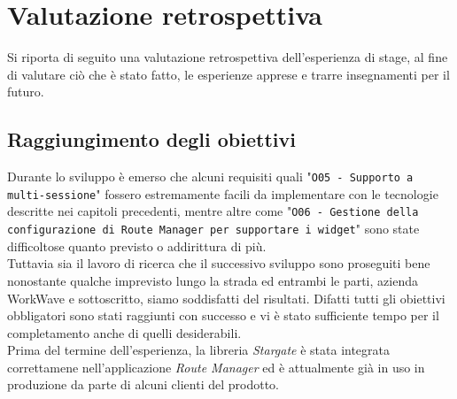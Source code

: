 
\chapter{Valutazione retrospettiva}
\label{cap:valutazione}

Si riporta di seguito una valutazione retrospettiva dell'esperienza di stage, al fine di valutare ciò che è stato fatto, le esperienze apprese e trarre insegnamenti per il futuro.

\section{Raggiungimento degli obiettivi}

Durante lo sviluppo è emerso che alcuni requisiti quali "\texttt{O05 - Supporto a multi-sessione}" fossero estremamente facili da implementare con le tecnologie descritte nei capitoli precedenti, mentre altre come "\texttt{O06 - Gestione della configurazione di Route Manager per supportare i widget}" sono state difficoltose quanto previsto o addirittura di più. \\

Tuttavia sia il lavoro di ricerca che il successivo sviluppo sono proseguiti bene nonostante qualche imprevisto lungo la strada ed entrambi le parti, azienda WorkWave e sottoscritto, siamo soddisfatti del risultati. Difatti tutti gli obiettivi obbligatori sono stati raggiunti con successo e vi è stato sufficiente tempo per il completamento anche di quelli desiderabili. \\

Prima del termine dell'esperienza, la libreria \textit{Stargate} è stata integrata correttamene nell'applicazione \textit{Route Manager} ed è attualmente già in uso in produzione da parte di alcuni clienti del prodotto. \\


